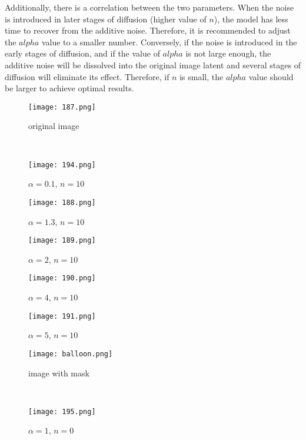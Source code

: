 \documentclass[10pt,twocolumn,letterpaper]{article}
\newcommand{\rulesep}{\unskip\ \vrule\ }
\begin{document}
Additionally, there is a correlation between the two parameters. When the noise is introduced in later stages of diffusion (higher value of $n$), the model has less time to recover from the additive noise. Therefore, it is recommended to adjust the $alpha$ value to a smaller number. Conversely, if the noise is introduced in the early stages of diffusion, and if the value of $alpha$ is not large enough, the additive noise will be dissolved into the original image latent and several stages of diffusion will eliminate its effect. Therefore, if $n$ is small, the $alpha$ value should be larger to achieve optimal results.

\begin{figure*}[!ht]
  \centering
      \begin{minipage}[b]{0.16\textwidth}
    \texttt{[image: 187.png]}
        \caption*{\small original image}
  \end{minipage} \rulesep
    \begin{minipage}[b]{0.16\textwidth}
    \texttt{[image: 194.png]}
        \caption*{$\alpha = 0.1$, $n=10$}
  \end{minipage}
    \begin{minipage}[b]{0.16\textwidth}
    \texttt{[image: 188.png]}
        \caption*{$\alpha = 1.3$, $n=10$}
  \end{minipage}
      \begin{minipage}[b]{0.16\textwidth}
    \texttt{[image: 189.png]}
        \caption*{$\alpha = 2$, $n=10$}
  \end{minipage}
      \begin{minipage}[b]{0.16\textwidth}
    \texttt{[image: 190.png]}
        \caption*{$\alpha = 4$, $n=10$}
  \end{minipage}
        \begin{minipage}[b]{0.16\textwidth}
    \texttt{[image: 191.png]}
        \caption*{$\alpha = 5$, $n=10$}
  \end{minipage}
        \begin{minipage}[b]{0.16\textwidth}
    \texttt{[image: balloon.png]}
        \caption*{\small image with mask}
  \end{minipage}\rulesep
    \begin{minipage}[b]{0.16\textwidth}
    \texttt{[image: 195.png]}
        \caption*{$\alpha = 1$, $n=0$}
  \end{minipage}
    \begin{minipage}[b]{0.16\textwidth}

\end{minipage}
\end{figure*}
\end{document}
